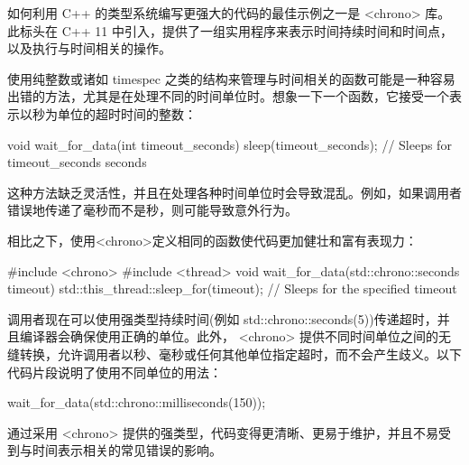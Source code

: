 如何利用 C++ 的类型系统编写更强大的代码的最佳示例之一是 <chrono> 库。此标头在 C++ 11 中引入，提供了一组实用程序来表示时间持续时间和时间点，以及执行与时间相关的操作。

使用纯整数或诸如 timespec 之类的结构来管理与时间相关的函数可能是一种容易出错的方法，尤其是在处理不同的时间单位时。想象一下一个函数，它接受一个表示以秒为单位的超时时间的整数：

\begin{cpp}
void wait_for_data(int timeout_seconds) {
    sleep(timeout_seconds); // Sleeps for timeout_seconds seconds
}
\end{cpp}

这种方法缺乏灵活性，并且在处理各种时间单位时会导致混乱。例如，如果调用者错误地传递了毫秒而不是秒，则可能导致意外行为。

相比之下，使用<chrono>定义相同的函数使代码更加健壮和富有表现力：

\begin{cpp}
#include <chrono>
#include <thread>
void wait_for_data(std::chrono::seconds timeout) {
    std::this_thread::sleep_for(timeout); // Sleeps for the specified timeout
}
\end{cpp}

调用者现在可以使用强类型持续时间(例如 std::chrono::seconds(5))传递超时，并且编译器会确保使用正确的单位。此外， <chrono> 提供不同时间单位之间的无缝转换，允许调用者以秒、毫秒或任何其他单位指定超时，而不会产生歧义。以下代码片段说明了使用不同单位的用法：

\begin{cpp}
wait_for_data(std::chrono::milliseconds(150));
\end{cpp}

通过采用 <chrono> 提供的强类型，代码变得更清晰、更易于维护，并且不易受到与时间表示相关的常见错误的影响。


